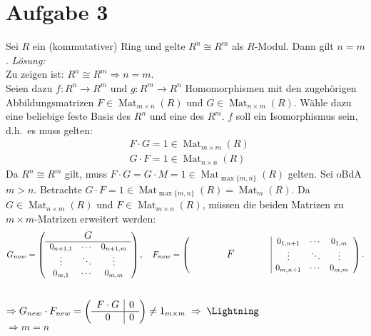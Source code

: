 \documentclass[]{scrartcl}
\newcommand{\<}{\trianglelefteq}
\DeclareMathOperator{\Mat}{Mat}
\begin{document}
\section*{Aufgabe 3}
Sei $R$ ein (kommutativer) Ring und gelte $R^n \cong R^m$ als $R$-Modul. Dann gilt $n=m$.
\textit{Lösung:}\\
Zu zeigen ist: $R^n \cong R^m \Rightarrow n=m.$\\
Seien dazu $f\colon R^n \to R^m$ und $g\colon R^m \to R^n$ Homomorphismen mit den zugehörigen Abbildungsmatrizen $F\in \Mat_{m\times n}(R)$ und $G\in \Mat_{n\times m}(R)$. Wähle dazu eine beliebige feste Basis des $R^n$ und eine des $R^m$. $f$ soll ein Isomorphismus sein, d.h.\ es muss gelten:
\begin{align*}
	&F\cdot G=1\in \Mat_{m\times m}(R)\\
	&G\cdot F=1\in \Mat_{n\times n}(R)
\end{align*}
Da $R^n \cong R^m$ gilt, muss $F\cdot G=G\cdot M=1\in \Mat_{\max\{m,n\}}(R)$ gelten.
Sei oBdA $m>n$. Betrachte $G\cdot F=1\in \Mat_{\max\{m,n\}}(R)=\Mat_{m}(R)$. Da $G\in \Mat_{n\times m}(R)$ und $F\in \Mat_{m\times n}(R)$, müssen die beiden Matrizen zu $m\times m$-Matrizen erweitert werden:
\[
\sbox0{$\begin{matrix}
	0_{1,n+1}&\cdots&0_{1,m}\\%
	\vdots&\ddots&\vdots\\%
	0_{m,n+1}&\cdots&0_{m,m}%
	\end{matrix}$}
\sbox1{$\begin{matrix}
	0_{n+1,1}&\cdots&0_{n+1,m}\\%
	\vdots&\ddots&\vdots\\%
	0_{m,1}&\cdots&0_{m,m}%
	\end{matrix}$}
G_{new}=\left(
\begin{array}{c}
\makebox[\wd0]{\large $G$}\\
\hline
\usebox{1}
\end{array}\right),\quad
F_{new}=\left(
\begin{array}{c|c}
\makebox[\wd0]{\large $F$}&\usebox{0}
\end{array}\right).
\]\\
$\Rightarrow G_{new}\cdot F_{new}=\left(
\begin{array}{c|c}
	F\cdot G&0\\
	\hline
	0&0
\end{array}\right)
\ne 1_{m\times m}\;\Rightarrow\; \mbox{\Lightning}$\\
$\Rightarrow m=n$
\end{document}
